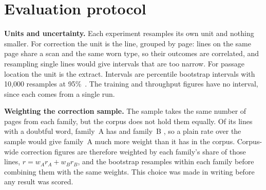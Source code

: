 \section{Evaluation protocol}
\label{sec:protocol}

\textbf{Units and uncertainty.} Each experiment resamples its own unit and
nothing smaller. For correction the unit is the line, grouped by page: lines on
the same page share a scan and the same worn type, so their outcomes are
correlated, and resampling single lines would give intervals that are too
narrow. For passage location the unit is the extract. Intervals are percentile
bootstrap intervals with 10{,}000 resamples at
95\%~\cite{efron1994bootstrap}. The training and throughput figures have no
interval, since each comes from a single run.

\textbf{Weighting the correction sample.} The sample takes the same number of
pages from each family, but the corpus does not hold them equally. Of its
\corrReachLinesWithSpan{} lines with a doubtful word, family~A has
\corrReachLinesWithSpanFamilyA{} and family~B \corrReachLinesWithSpanFamilyB{},
so a plain rate over the sample would give family~A much more weight than it
has in the corpus. Corpus-wide correction figures are therefore weighted by each
family's share of those lines, $r = w_A r_A + w_B r_B$, and the bootstrap
resamples within each family before combining them with the same weights. This
choice was made in writing before any result was scored.
